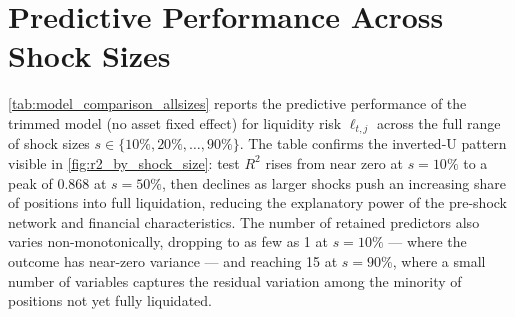 \documentclass[a4paper,UKenglish,cleveref, autoref, thm-restate]{informs3}
\begin{document}
\newpage
\section{Predictive Performance Across Shock Sizes}
\label{app:shock_sizes}

\autoref{tab:model_comparison_allsizes} reports the predictive
performance of the trimmed model (no asset fixed effect) for
liquidity risk $\ell_{t,j}$ across the full range of shock sizes
$s \in \{10\%, 20\%, \ldots, 90\%\}$. The table confirms the
inverted-U pattern visible in \autoref{fig:r2_by_shock_size}:
test $R^2$ rises from near zero at $s = 10\%$ to a peak of 0.868
at $s = 50\%$, then declines as larger shocks push an increasing
share of positions into full liquidation, reducing the explanatory
power of the pre-shock network and financial characteristics. The
number of retained predictors also varies non-monotonically,
dropping to as few as 1 at $s = 10\%$ --- where the outcome has
near-zero variance --- and reaching 15 at $s = 90\%$, where a
small number of variables captures the residual variation among
the minority of positions not yet fully liquidated.
\end{document}
